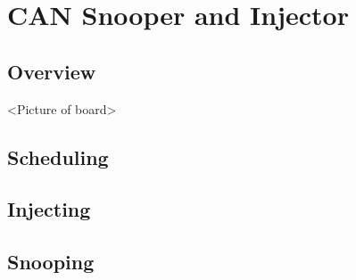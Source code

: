 \section{CAN Snooper and Injector}


\subsection{Overview}

<Picture of board>


\subsection{Scheduling}


\subsection{Injecting}


\subsection{Snooping}